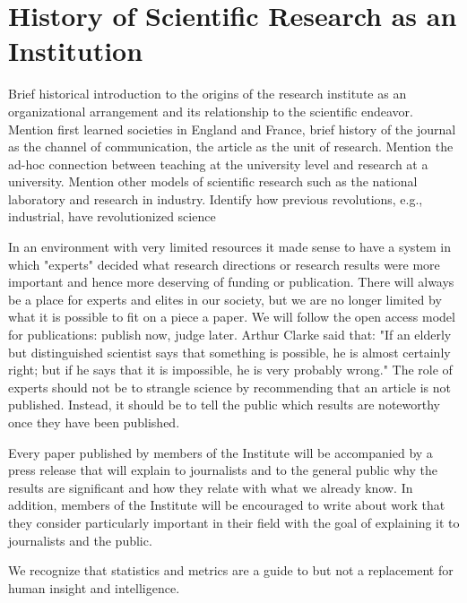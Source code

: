 \section{History of Scientific Research as an Institution}
Brief historical introduction to the origins of the research institute as an organizational arrangement and its relationship to the scientific endeavor. Mention first learned societies in England and France, brief history of the journal as the channel of communication, the article as the unit of research. Mention the ad-hoc connection between teaching at the university level and research at a university. Mention other models of scientific research such as the national laboratory and research in industry. Identify how previous revolutions, e.g., industrial, have revolutionized science 

In an environment with very limited resources it made sense to have a system in which "experts" decided what research directions or research results were more important and hence more deserving of funding or publication. There will always be a place for experts and elites in our society, but we are no longer limited by what it is possible to fit on a piece a paper. We will follow the open access model for publications: publish now, judge later. Arthur Clarke said that: "If an elderly but distinguished scientist says that something is possible, he is almost certainly right; but if he says that it is impossible, he is very probably wrong." The role of experts should not be to strangle science by recommending that an article is not published. Instead, it should be to tell the public which results are noteworthy once they have been published.

Every paper published by members of the Institute will be accompanied by a press release that will explain to journalists and to the general public why the results are significant and how they relate with what we already know. In addition, members of the Institute will be encouraged to write about work that they consider particularly important in their field with the goal of explaining it to journalists and the public.

We recognize that statistics and metrics are a guide to but not a replacement for human insight and intelligence.